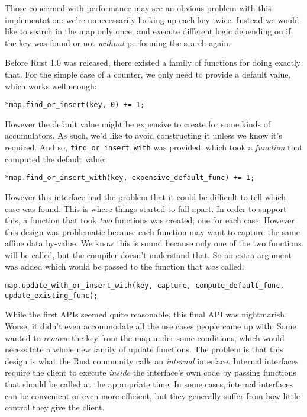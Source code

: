 Those concerned with performance may see an obvious problem with this implementation:
we're unnecessarily looking up each key twice. Instead we would like to search in the
map only once, and execute different logic depending on if the key was found or not
\emph{without} performing the search again.

Before Rust 1.0 was released, there existed a family of functions for doing exactly
that. For the simple case of a counter, we only need to provide a default value,
which works well enough:

\begin{verbatim}
*map.find_or_insert(key, 0) += 1;
\end{verbatim}

However the default value might be expensive to create for some kinds of accumulators.
As such, we'd like to avoid constructing it unless we know it's required.
And so, \texttt{find_or_insert_with} was provided, which took a
\emph{function} that computed the default value:

\begin{verbatim}
*map.find_or_insert_with(key, expensive_default_func) += 1;
\end{verbatim}

However this interface had the problem that it could be difficult to tell which
case was found. This is where things started to fall apart. In order to support
this, a function that took \emph{two} functions was created; one for each case. However this
design was problematic because each function
may want to capture the same affine data by-value. We know this is sound because only
one of the two functions will be called, but the compiler doesn't understand that.
So an extra argument was added which would be passed to the function that \emph{was}
called.

\begin{verbatim}
map.update_with_or_insert_with(key, capture, compute_default_func, update_existing_func);
\end{verbatim}

While the first APIs seemed quite reasonable, this final API was nightmarish. Worse,
it didn't even accommodate all the use cases people came up with. Some wanted
to \emph{remove} the key from the map under some conditions, which would necessitate
a whole new family of update functions. The problem is that this design is what the
Rust community calls an \emph{internal} interface. Internal interfaces require the client
to execute \emph{inside} the interface's own code by passing functions that should be
called at the appropriate time. In some cases, internal interfaces can be convenient
or even more efficient, but they generally suffer from how little control they give
the client.

